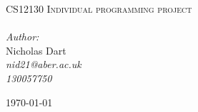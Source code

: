 \begin{titlepage}

\begin{center}

\textsc{\LARGE CS12130 Individual programming project}\\[1.5cm]


\HRule \\[1.5cm]

\emph{Author:}\\
Nicholas Dart\\
\emph{nid21@aber.ac.uk\\130057750}

\vfill

{\large \today}

\end{center}


\end{titlepage}